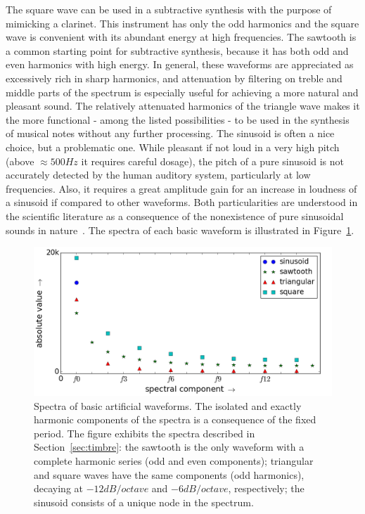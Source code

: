 The square wave can be used in a subtractive synthesis with the purpose of mimicking a clarinet.
This instrument has only the odd harmonics and the square wave is convenient with its abundant energy at high frequencies.
The sawtooth is a common starting point for subtractive synthesis,
because it has both odd and even harmonics with high energy.
In general, these waveforms are appreciated as excessively rich in sharp harmonics,
and attenuation by filtering on treble and middle parts of the spectrum is 
especially useful for achieving a more natural and pleasant sound. 
The relatively attenuated harmonics of the triangle wave makes it the more functional 
- among the listed possibilities - to be used in the synthesis of musical notes without any further processing.
The sinusoid is often a nice choice, but a problematic one.
While pleasant if not loud in a very high pitch (above $\approx 500Hz$ it requires careful dosage),
the pitch of a pure sinusoid is not accurately detected by the human auditory system,
particularly at low frequencies.
Also, it requires a great amplitude gain for an increase in loudness of a sinusoid
if compared to other waveforms. Both particularities are understood in the scientific
literature as a consequence of the nonexistence of pure sinusoidal sounds in nature~\cite{Roederer}.
The spectra of each basic waveform is illustrated in Figure~\ref{fig:espectroDeOndas}.

\begin{figure}
    \centering
        \includegraphics[width=.7\textwidth]{figures/waveSpectrum_}
    \caption{Spectra of basic artificial waveforms.
The isolated and exactly harmonic components of the spectra is a consequence of the fixed period.
	The figure exhibits the spectra described in Section~\ref{sec:timbre}:
	the sawtooth is the only waveform with a complete harmonic series (odd and even components);
	triangular and square waves have the same components (odd harmonics), decaying at $-12dB/octave$ and $-6dB/octave$, respectively;
	the sinusoid consists of a unique node in the spectrum.
	}
        \label{fig:espectroDeOndas}
\end{figure}


